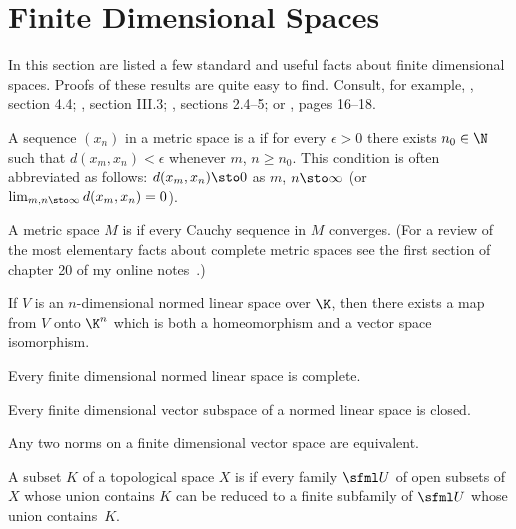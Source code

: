 \section{Finite Dimensional Spaces}
In this section are listed a few standard and useful facts about finite dimensional spaces. Proofs of these results
are quite easy to find.  Consult, for example, \cite{BrownP:1970}, section 4.4; \cite{Conway:1990}, section III.3;
\cite{Kreyszig:1978}, sections 2.4--5; or \cite{Rudin:1991}, pages 16--18.

\begin{defn} A sequence $(x_n)$ in a metric space is a
 if for every $\epsilon > 0$ there exists $n_0 \in \N$ such that
$d(x_m,x_n) < \epsilon$ whenever $m$, $n \ge n_0$. This condition is often abbreviated as
follows: $d(x_m, x_n) \sto 0$ as $m$, $n \sto \infty$ (or $\lim_{m,n \sto
\infty}d(x_m,x_n) = 0$).
\end{defn}

\begin{defn} A metric space $M$ is
 if every Cauchy sequence in $M$ converges. (For a review of the most elementary facts about complete
metric spaces see the first section of chapter 20 of my online notes~\cite{Erdman:2007}.)
\end{defn}

\begin{prop}\label{prop_fdnls_Kn} If $V$ is an $n$-dimensional normed linear space over $\K$, then there exists a map
from $V$ onto $\K^n$ which is both a homeomorphism and a vector space isomorphism.
\end{prop}

\begin{cor} Every finite dimensional normed linear space is complete.
\end{cor}

\begin{cor}\label{cor_fdvs_closed} Every finite dimensional vector subspace of a normed linear space is closed.
\end{cor}

\begin{cor}\label{cor_fdvs_norms_equiv} Any two norms on a finite dimensional vector space are equivalent.
\end{cor}

\begin{defn} A subset $K$ of a topological space $X$ is
 if every family $\sfml U$ of open subsets of $X$ whose union contains $K$ can be reduced to a finite
subfamily of $\sfml U$ whose union contains~$K$.
\end{defn}

